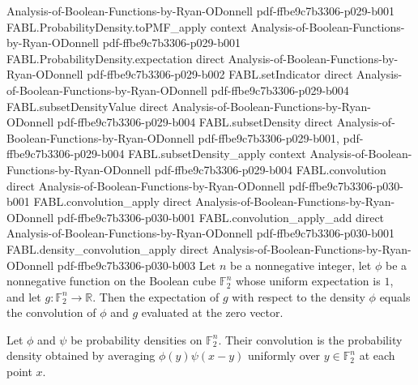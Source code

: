 \begin{theorem}
  {Analysis-of-Boolean-Functions-by-Ryan-ODonnell}
  {pdf-ffbe9c7b3306-p029-b001}
\proofstep
  {FABL.ProbabilityDensity.toPMF_apply}
  {context}
  {Analysis-of-Boolean-Functions-by-Ryan-ODonnell}
  {pdf-ffbe9c7b3306-p029-b001}
\proofstep
  {FABL.ProbabilityDensity.expectation}
  {direct}
  {Analysis-of-Boolean-Functions-by-Ryan-ODonnell}
  {pdf-ffbe9c7b3306-p029-b002}
\proofstep
  {FABL.setIndicator}
  {direct}
  {Analysis-of-Boolean-Functions-by-Ryan-ODonnell}
  {pdf-ffbe9c7b3306-p029-b004}
\proofstep
  {FABL.subsetDensityValue}
  {direct}
  {Analysis-of-Boolean-Functions-by-Ryan-ODonnell}
  {pdf-ffbe9c7b3306-p029-b004}
\proofstep
  {FABL.subsetDensity}
  {direct}
  {Analysis-of-Boolean-Functions-by-Ryan-ODonnell}
  {pdf-ffbe9c7b3306-p029-b001,
    pdf-ffbe9c7b3306-p029-b004}
\proofstep
  {FABL.subsetDensity_apply}
  {context}
  {Analysis-of-Boolean-Functions-by-Ryan-ODonnell}
  {pdf-ffbe9c7b3306-p029-b004}
\proofstep
  {FABL.convolution}
  {direct}
  {Analysis-of-Boolean-Functions-by-Ryan-ODonnell}
  {pdf-ffbe9c7b3306-p030-b001}
\proofstep
  {FABL.convolution_apply}
  {direct}
  {Analysis-of-Boolean-Functions-by-Ryan-ODonnell}
  {pdf-ffbe9c7b3306-p030-b001}
\proofstep
  {FABL.convolution_apply_add}
  {direct}
  {Analysis-of-Boolean-Functions-by-Ryan-ODonnell}
  {pdf-ffbe9c7b3306-p030-b001}
\proofstep
  {FABL.density_convolution_apply}
  {direct}
  {Analysis-of-Boolean-Functions-by-Ryan-ODonnell}
  {pdf-ffbe9c7b3306-p030-b003}
Let $n$ be a nonnegative integer, let $\phi$ be a nonnegative function on the Boolean
cube $\mathbb{F}_2^n$ whose uniform expectation is $1$, and let $g: \mathbb{F}_2^n \to
\mathbb{R}$. Then the expectation of $g$ with respect to the density $\phi$ equals the
convolution of $\phi$ and $g$ evaluated at the zero vector.
\end{theorem}

\begin{definition}
\label{FABL.ProbabilityDensity.convolution}
\leanok
{}
Let $\phi$ and $\psi$ be probability densities on $\mathbb{F}_2^n$. Their convolution
is the probability density obtained by averaging $\phi(y)\psi(x-y)$ uniformly over
$y\in\mathbb{F}_2^n$ at each point $x$.
\end{definition}

